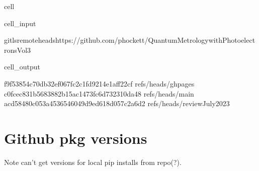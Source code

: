 \documentclass[letterpaper,table,10pt,english]{jupyterBook}
\begin{document}
\begin{sphinxuseclass}{cell}\begin{sphinxVerbatimInput}

\begin{sphinxuseclass}{cell_input}
\begin{sphinxVerbatim}[commandchars=\\\{\}]
gitls\PYGZhy{}remote\PYGZhy{}\PYGZhy{}headshttps://github.com/phockett/Quantum\PYGZhy{}Metrology\PYGZhy{}with\PYGZhy{}Photoelectrons\PYGZhy{}Vol3
\end{sphinxVerbatim}

\end{sphinxuseclass}\end{sphinxVerbatimInput}
\begin{sphinxVerbatimOutput}

\begin{sphinxuseclass}{cell_output}
\begin{sphinxVerbatim}[commandchars=\\\{\}]
f9f53854c70db32ef067fc2c1fd9214e1aff22cf	refs/heads/gh\PYGZhy{}pages
c0fcec831b5683882b15ac1473fc6d732310da48	refs/heads/main
acd58480c053a4536546049d9ed618d057c2a6d2	refs/heads/reviewJuly2023
\end{sphinxVerbatim}

\end{sphinxuseclass}\end{sphinxVerbatimOutput}

\end{sphinxuseclass}

\section{Github pkg versions}
\label{\detokenize{tests/build_versions_checks:github-pkg-versions}}
\sphinxAtStartPar
Note \sphinxhyphen{} can’t get versions for local pip installs from repo(?).
\end{document}
